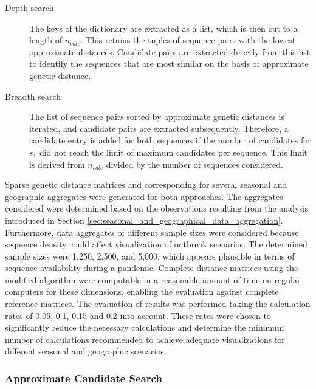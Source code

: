 \begin{description}
    \item[Depth search] The keys of the dictionary are extracted as a list, which is then cut to a length of $n_{calc}$. This retains the tuples of sequence pairs with the lowest approximate distances. Candidate pairs are extracted directly from this list to identify the sequences that are most similar on the basis of approximate genetic distance.
    \item[Breadth search] The list of sequence pairs sorted by approximate genetic distances is iterated, and candidate pairs are extracted subsequently. Therefore, a candidate entry is added for both sequences if the number of candidates for $s_1$ did not reach the limit of maximum candidates per sequence. This limit is derived from $n_{calc}$ divided by the number of sequences considered.
\end{description}

Sparse genetic distance matrices and corresponding  for several seasonal and geographic aggregates were generated for both approaches. The aggregates considered were determined based on the observations resulting from the analysis introduced in Section \ref{sec:seasonal_and_geographical_data_aggregation}. Furthermore, data aggregates of different sample sizes were considered because sequence density could affect visualization of outbreak scenarios. The determined sample sizes were 1,250, 2,500, and 5,000, which appears plausible in terms of sequence availability during a pandemic. Complete distance matrices using the modified algorithm were computable in a reasonable amount of time on regular computers for these dimensions, enabling the evaluation against complete reference matrices. The evaluation of results was performed taking the calculation rates of 0.05, 0.1, 0.15 and 0.2 into account. These rates were chosen to significantly reduce the necessary calculations and determine the minimum number of calculations recommended to achieve adequate visualizations for different seasonal and geographic scenarios. 

\subsubsection{Approximate Candidate Search}
\label{sec:approximate_candidate_search}

